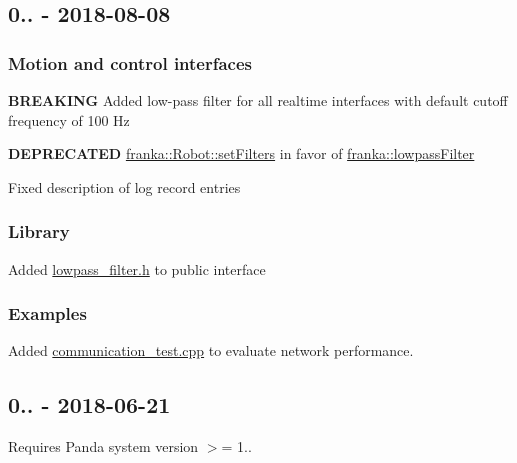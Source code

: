 \subsection*{0.. -\/ 2018-\/08-\/08}

\subsubsection*{Motion and control interfaces}


\begin{DoxyItemize}
\item {\bfseries B\+R\+E\+A\+K\+I\+NG} Added low-\/pass filter for all realtime interfaces with default cutoff frequency of 100 Hz
\item {\bfseries D\+E\+P\+R\+E\+C\+A\+T\+ED} {\ttfamily \hyperlink{classfranka_1_1Robot_aebce1a0dbe3b139bb24001845b2afe07}{franka\+::\+Robot\+::set\+Filters}} in favor of {\ttfamily \hyperlink{namespacefranka_a94c21b0e87afce0147a9cd6025c239ca}{franka\+::lowpass\+Filter}}
\item Fixed description of log record entries
\end{DoxyItemize}

\subsubsection*{Library}


\begin{DoxyItemize}
\item Added {\ttfamily \hyperlink{lowpass__filter_8h}{lowpass\+\_\+filter.\+h}} to public interface
\end{DoxyItemize}

\subsubsection*{Examples}


\begin{DoxyItemize}
\item Added {\ttfamily \hyperlink{communication__test_8cpp}{communication\+\_\+test.\+cpp}} to evaluate network performance.
\end{DoxyItemize}

\subsection*{0.. -\/ 2018-\/06-\/21}

Requires Panda system version $>$= 1..


